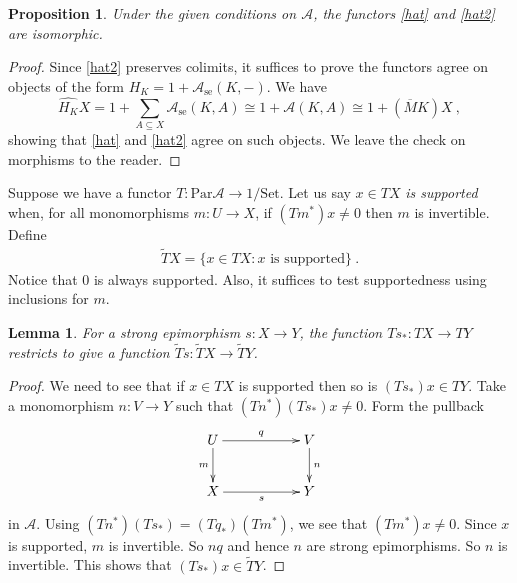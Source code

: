 \documentclass[a4paper,12pt,reqno]{amsart}
\newtheorem{lemma}[theorem]{Lemma}
\newtheorem{proposition}[theorem]{Proposition}
\theoremstyle{definition}
\theoremstyle{fact}
\theoremstyle{genquest}
\theoremstyle{step}
\newcommand{\lra}{\longrightarrow}
\def\CA{{\mathscr A}}
\begin{document}
\begin{proposition} Under the given conditions on $\CA$, the functors \eqref{hat}
and \eqref{hat2} are isomorphic.
\end{proposition}
\begin{proof}
Since \eqref{hat2} preserves colimits, it suffices to prove the functors agree on
objects of the form $H_K=1+ \CA_{\mathrm{se}}(K,-)$. 
We have
$$\widehat{H_K}X =1+ \sum_{A\subseteq X}{\CA_{\mathrm{se}}(K,A)} 
\cong 1 +\CA(K,A) \cong 1 + (\overline{M}K)X \ , 
$$
showing that \eqref{hat} and \eqref{hat2} agree on such objects. 
We leave the check on morphisms to the reader. 
\end{proof}

Suppose we have a functor $T : \mathrm{Par}\CA \lra 1/\mathrm{Set}$.
Let us say $x\in TX$ {\em is supported} when, for all monomorphisms 
$m: U\lra X$, if $(Tm^*)x \neq 0$ then $m$ is invertible. 
Define 
\begin{eqnarray}\label{fs}
\widetilde{T}X = \{x\in TX : x \text{ is supported} \} \ .
\end{eqnarray}
Notice that $0$ is always supported.
Also, it suffices to test supportedness using inclusions for $m$.

\begin{lemma} For a strong epimorphism $s : X \lra Y$, the function 
$Ts_* : TX \lra TY$ restricts to give a function $\widetilde{T}s : \widetilde{T}X \lra \widetilde{T}Y$.  
\end{lemma}
\begin{proof}
We need to see that if $x\in TX$ is supported then so is $(Ts_*)x\in TY$. 
Take a monomorphism $n:V\lra Y$ such that $(Tn^*)(Ts_*)x \neq 0$.
Form the pullback
\begin{equation}\label{pbmse}
\xymatrix{
U \ar[rr]^-{q} \ar[d]_-{m} && V \ar[d]^-{n} \\
X \ar[rr]_-{s} && Y}
\end{equation}
in $\CA$. Using $(Tn^*)(Ts_*) = (Tq_*)(Tm^*)$, we see that 
$(Tm^*)x \neq 0$. Since $x$ is supported, $m$ is invertible.
So $nq$ and hence $n$ are strong epimorphisms.
So $n$ is invertible. This shows that $(Ts_*)x \in \widetilde{T}Y$.   
\end{proof}
\end{document}
